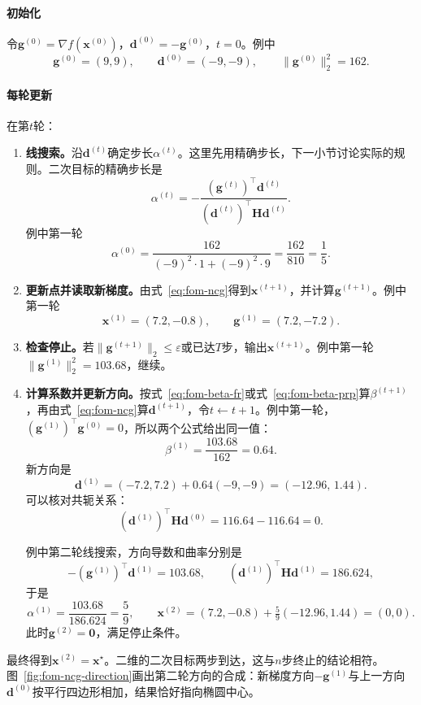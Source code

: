 \paragraph{初始化}
令$\bm{g}^{(0)}=\nabla f(\bm{x}^{(0)})$，$\bm{d}^{(0)}=-\bm{g}^{(0)}$，$t=0$。例中
\[
 \bm{g}^{(0)}=(9,9),\qquad\bm{d}^{(0)}=(-9,-9),\qquad\lVert\bm{g}^{(0)}\rVert_2^2=162.
\]

\paragraph{每轮更新}
在第$t$轮：
\begin{enumerate}
 \item \textbf{线搜索。}沿$\bm{d}^{(t)}$确定步长$\alpha^{(t)}$。这里先用精确步长，下一小节讨论实际的规则。二次目标的精确步长是
 \[
  \alpha^{(t)}=-\frac{(\bm{g}^{(t)})^\top\bm{d}^{(t)}}{(\bm{d}^{(t)})^\top\bm{H}\bm{d}^{(t)}}.
 \]
 例中第一轮
 \[
  \alpha^{(0)}=\frac{162}{(-9)^2\cdot1+(-9)^2\cdot9}=\frac{162}{810}=\frac15.
 \]

\item \textbf{更新点并读取新梯度。}由式~\eqref{eq:fom-ncg}得到$\bm{x}^{(t+1)}$，并计算$\bm{g}^{(t+1)}$。例中第一轮
 \[
  \bm{x}^{(1)}=(7.2,-0.8),\qquad\bm{g}^{(1)}=(7.2,-7.2).
 \]

\item \textbf{检查停止。}若$\lVert\bm{g}^{(t+1)}\rVert_2\leq\varepsilon$或已达$T$步，输出$\bm{x}^{(t+1)}$。例中第一轮$\lVert\bm{g}^{(1)}\rVert_2^2=103.68$，继续。

\item \textbf{计算系数并更新方向。}按式~\eqref{eq:fom-beta-fr}或式~\eqref{eq:fom-beta-prp}算$\beta^{(t+1)}$，再由式~\eqref{eq:fom-ncg}算$\bm{d}^{(t+1)}$，令$t\leftarrow t+1$。例中第一轮，$(\bm{g}^{(1)})^\top\bm{g}^{(0)}=0$，所以两个公式给出同一值：
 \[
  \beta^{(1)}=\frac{103.68}{162}=0.64.
 \]
 新方向是
 \[
  \bm{d}^{(1)}=(-7.2,7.2)+0.64(-9,-9)=(-12.96,\,1.44).
 \]
 可以核对共轭关系：
 \[
  (\bm{d}^{(1)})^\top\bm{H}\bm{d}^{(0)}=116.64-116.64=0.
 \]

 例中第二轮线搜索，方向导数和曲率分别是
 \[
  -(\bm{g}^{(1)})^\top\bm{d}^{(1)}=103.68,\qquad(\bm{d}^{(1)})^\top\bm{H}\bm{d}^{(1)}=186.624,
 \]
 于是
 \[
  \alpha^{(1)}=\frac{103.68}{186.624}=\frac59,\qquad
  \bm{x}^{(2)}=(7.2,-0.8)+\tfrac59(-12.96,1.44)=(0,0).
 \]
 此时$\bm{g}^{(2)}=\bm{0}$，满足停止条件。
\end{enumerate}

最终得到$\bm{x}^{(2)}=\bm{x}^\star$。二维的二次目标两步到达，这与$n$步终止的结论相符。图~\ref{fig:fom-ncg-direction}画出第二轮方向的合成：新梯度方向$-\bm{g}^{(1)}$与上一方向$\bm{d}^{(0)}$按平行四边形相加，结果恰好指向椭圆中心。

